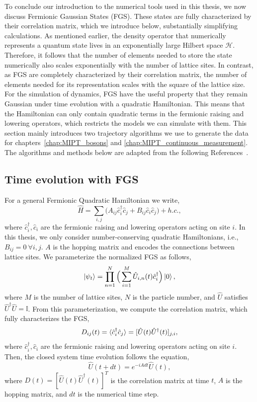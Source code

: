 To conclude our introduction to the numerical tools used in this thesis, we now discuss Fermionic Gaussian States (FGS). These states are fully characterized by their correlation matrix, which we introduce below, substantially simplifying calculations. As mentioned earlier, the density operator that numerically represents a quantum state lives in an exponentially large Hilbert space $\mathcal{H}$. Therefore, it follows that the number of elements needed to store the state numerically also scales exponentially with the number of lattice sites. In contrast, as FGS are completely characterized by their correlation matrix, the number of elements needed for its representation scales with the square of the lattice size. For the simulation of dynamics, FGS have the useful property that they remain Gaussian under time evolution with a quadratic Hamiltonian. This means that the Hamiltonian can only contain quadratic terms in the fermionic raising and lowering operators, which restricts the models we can simulate with them. This section mainly introduces two trajectory algorithms we use to generate the data for chapters~\ref{chap:MIPT_bosons} and \ref{chap:MIPT_continuous_measurement}. The algorithms and methods below are adapted from the following References~\cite{alberton2021,cao2019,surace2022}. 

\subsection{Time evolution with FGS}
For a general Fermionic Quadratic Hamiltonian we write,
\begin{equation}
    \hat{H} = \sum\limits_{i,j} \big(A_{ij} \hat{c}_i^\dagger \hat{c}_j + B_{ij} \hat{c}_i \hat{c}_j \big) + h.c.,
\end{equation}
where $\hat{c}_i^\dagger,\hat{c}_i$ are the fermionic raising and lowering operators acting on site $i$. In this thesis, we only consider number-conserving quadratic Hamiltonians, i.e., $B_{ij} = 0 ~\forall i,j$. $A$ is the hopping matrix and encodes the connections between lattice sites. We parameterize the normalized FGS as follows, 
\begin{equation}
\label{eq:fgs}
\ket{\psi_t} = \prod_{n=1}^N\Big( \sum\limits_{i=1}^M \hat{U}_{i,n}(t) \hat{c}^\dagger_i \Big) \ket{0},
\end{equation}
where $M$ is the number of lattice sites, $N$ is the particle number, and $\hat{U}$ satisfies $\hat{U}^\dagger \hat{U} = \mathbb{I}$. From this parameterization, we compute the correlation matrix, which fully characterizes the FGS,
\begin{equation}
    D_{ij}(t) = \langle\hat{c}_i^\dagger \hat{c}_j\rangle = [\hat{U}(t) \hat{U}^\dagger(t)]_{j,i},
\end{equation}
where $\hat{c}_i^\dagger,\hat{c}_i$ are the fermionic raising and lowering operators acting on site $i$. 
Then, the closed system time evolution follows the equation, 
\begin{equation}
\label{eq:timeev}
\hat{U}(t+dt) = e^{-iA dt} \hat{U}(t),
\end{equation}
where $D(t) = [\hat{U}(t)\hat{U}^\dagger(t)]^T$ is the correlation matrix at time $t$, $A$ is the hopping matrix, and $dt$ is the numerical time step.


